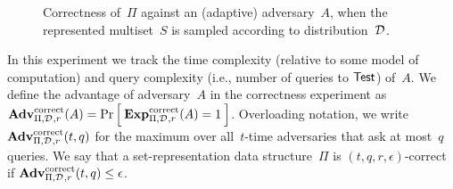 \begin{figure}[htp]
\centering
{}
\caption{Correctness of~$\Pi$ against an (adaptive) adversary~$A$, when
  the represented multiset~$S$ is sampled according to distribution~$\mathcal{D}_{}^{}$.}
\label{fig:correctness}
\end{figure}

In this experiment we track the time complexity (relative to some
model of computation) and query complexity (i.e., number of
queries to $\mathsf{Test}$) of~$A$.
We define the advantage of adversary~$A$ in the correctness experiment as
$\mathrm{\mathbf{Adv}}^{\mathrm{correct}}_{\Pi,\mathcal{D}_{}^{},r}(A) = \Pr\left[\: \mathrm{\mathbf{Exp}}^{\mathrm{correct}}_{\Pi,\mathcal{D}_{}^{}, r}(A)=1 \:\right]$.
Overloading notation, we write $\mathrm{\mathbf{Adv}}^{\mathrm{correct}}_{\Pi,\mathcal{D}_{}^{},r}(t,q)$ for the maximum over
all~$t$-time adversaries that ask at most~$q$ queries. We say that a
set-representation data structure~$\Pi$ is $(t,q,r,\epsilon)$-correct if $\mathrm{\mathbf{Adv}}^{\mathrm{correct}}_{\Pi,\mathcal{D}_{}^{},r}(t,q) \leq \epsilon$.

